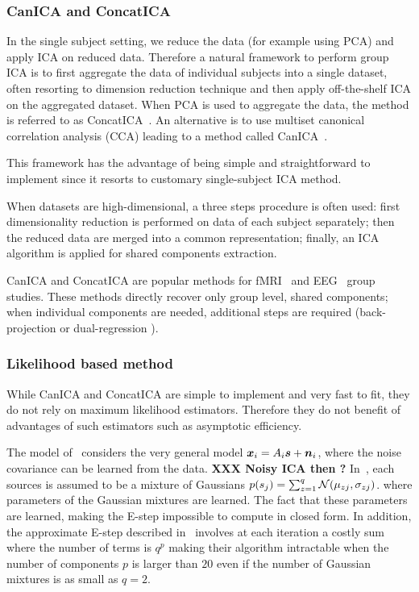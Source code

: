 \subsubsection{CanICA and ConcatICA}
\label{sec:canicaandconcatica}
In the single subject setting, we reduce the data (for example using PCA) and apply ICA on
reduced data. Therefore a natural framework to perform group ICA is to first aggregate the
data of individual subjects into a single dataset, often resorting to dimension
reduction technique and then apply off-the-shelf ICA on the aggregated dataset.
When PCA is used to aggregate the data, the method is referred to as
ConcatICA~\cite{calhoun2001method}. An alternative is to use multiset canonical
correlation analysis (CCA) leading to a method called CanICA~\cite{varoquaux2009canica}.

This framework has the advantage of being simple and
straightforward to implement since it resorts to customary single-subject
ICA method.

When datasets are high-dimensional, a three steps procedure is often used: first
dimensionality reduction is performed on data of each subject  separately; then
the reduced data are merged into a common representation; finally, an ICA
algorithm is applied for shared components extraction.

CanICA and ConcatICA are popular methods for fMRI~\cite{calhoun2009review} and EEG~\cite{eichele2011eegift} group studies. These methods directly recover only group level, shared components; when individual components are needed, additional steps are required (back-projection \cite{calhoun2001method} or dual-regression \cite{beckmann2009group}).
% 

\subsubsection{Likelihood based method}
\label{sec:guo}
While CanICA and ConcatICA are simple to implement and very fast to fit, they do
not rely on maximum likelihood estimators. Therefore they do not benefit of
advantages of such estimators such as asymptotic efficiency.

The model of~\cite{guo2008unified} considers the very general model $\boldsymbol{x}_i = A_i\boldsymbol{s} + \boldsymbol{n}_i$, where the noise covariance can be learned from the data. 
\textbf{XXX Noisy ICA then ?}
In~\cite{guo2008unified}, each sources is assumed to be a mixture of Gaussians
$p(s_j) = \sum_{z=1}^q \mathcal{N}(\mu_{zj}, \sigma_{zj})$.
where parameters of the Gaussian mixtures are learned. The fact that these
parameters are learned, making the E-step impossible to compute in closed form. In
addition, the
approximate E-step described in~\cite{guo2008unified} involves at each iteration
a costly sum where the number of terms is $q^p$ making their algorithm
intractable when the number of components $p$ is larger than $20$ even if the
number of Gaussian mixtures is as small as $q=2$. 

